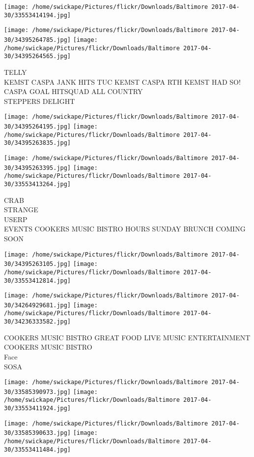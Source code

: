 \documentclass[10pt,letterpaper]{article}
\begin{document}
\texttt{[image: /home/swickape/Pictures/flickr/Downloads/Baltimore 2017-04-30/33553414194.jpg]}

\vspace{0.25in}
\texttt{[image: /home/swickape/Pictures/flickr/Downloads/Baltimore 2017-04-30/34395264785.jpg]}
\texttt{[image: /home/swickape/Pictures/flickr/Downloads/Baltimore 2017-04-30/34395264565.jpg]}

TELLY\\
KEMST CASPA JANK HITS TUC KEMST CASPA RTH KEMST HAD SO!  CASPA GOAL HITSQUAD ALL COUNTRY\\
STEPPERS DELIGHT
\pagebreak

\texttt{[image: /home/swickape/Pictures/flickr/Downloads/Baltimore 2017-04-30/34395264195.jpg]}
\texttt{[image: /home/swickape/Pictures/flickr/Downloads/Baltimore 2017-04-30/34395263835.jpg]}

\texttt{[image: /home/swickape/Pictures/flickr/Downloads/Baltimore 2017-04-30/34395263395.jpg]}
\texttt{[image: /home/swickape/Pictures/flickr/Downloads/Baltimore 2017-04-30/33553413264.jpg]}

CRAB\\
STRANGE\\
USERP\\
EVENTS COOKERS MUSIC BISTRO HOURS SUNDAY BRUNCH COMING SOON
\pagebreak

\texttt{[image: /home/swickape/Pictures/flickr/Downloads/Baltimore 2017-04-30/34395263105.jpg]}
\texttt{[image: /home/swickape/Pictures/flickr/Downloads/Baltimore 2017-04-30/33553412814.jpg]}

\texttt{[image: /home/swickape/Pictures/flickr/Downloads/Baltimore 2017-04-30/34264929681.jpg]}
\texttt{[image: /home/swickape/Pictures/flickr/Downloads/Baltimore 2017-04-30/34236333582.jpg]}

COOKERS MUSIC BISTRO GREAT FOOD LIVE MUSIC ENTERTAINMENT\\
COOKERS MUSIC BISTRO\\
Face\\
SOSA
\pagebreak

\texttt{[image: /home/swickape/Pictures/flickr/Downloads/Baltimore 2017-04-30/33585390973.jpg]}
\texttt{[image: /home/swickape/Pictures/flickr/Downloads/Baltimore 2017-04-30/33553411924.jpg]}

\texttt{[image: /home/swickape/Pictures/flickr/Downloads/Baltimore 2017-04-30/33585390633.jpg]}
\texttt{[image: /home/swickape/Pictures/flickr/Downloads/Baltimore 2017-04-30/33553411484.jpg]}
\end{document}
